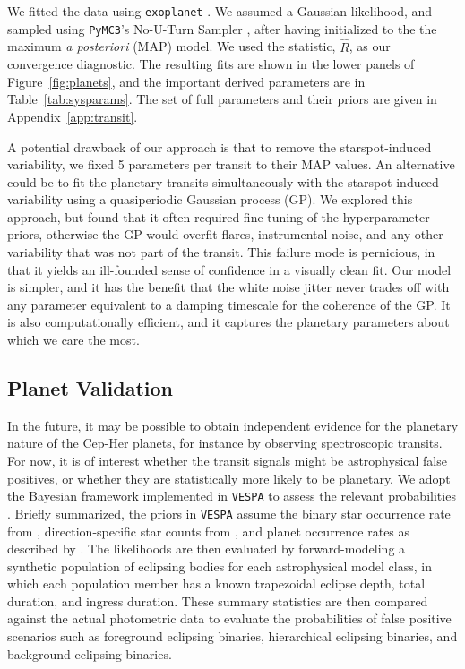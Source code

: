 \documentclass[12pt,twocolumn]{aastex63}
\begin{document}
We fitted the data using \texttt{exoplanet}
\citep{exoplanet:exoplanet}.  We assumed a Gaussian likelihood, and
sampled using \texttt{PyMC3}'s No-U-Turn Sampler
\citep{hoffman_no-u-turn_2014}, after having initialized to the the
maximum {\it a posteriori} (MAP) model.  We used the
\citet{gelman_inference_1992} statistic, $\hat{R}$, as our convergence
diagnostic.  The resulting fits are shown in the lower panels of
Figure~\ref{fig:planets}, and the important derived parameters are in
Table~\ref{tab:sysparams}.  The set of full parameters and their
priors are given in Appendix~\ref{app:transit}.

A potential drawback of our approach is that to remove
the starspot-induced variability, we fixed 5 
parameters per transit to their MAP values.
An alternative could be to fit the
planetary transits simultaneously with the starspot-induced
variability using a quasiperiodic Gaussian process (GP).  We explored
this approach, but found that it often required fine-tuning of the
hyperparameter priors, otherwise the GP would overfit flares,
instrumental noise, and any other variability that was not part of the
transit.  This failure mode is pernicious, in that it yields an
ill-founded sense of confidence in a visually clean fit.  Our model is
simpler, and it has the benefit that the white noise jitter never
trades off with any parameter equivalent to a damping timescale for
the coherence of the GP.  It is also computationally efficient, and it
captures the planetary parameters about which we care the most.


\subsection{Planet Validation}

In the future, it may be possible to obtain independent evidence for
the planetary nature of the Cep-Her planets, for instance by observing
spectroscopic transits.  For now,
it is of interest whether the transit signals might be astrophysical
false positives, or whether they are statistically more likely to be
planetary.  We adopt the Bayesian framework implemented in
\texttt{VESPA} to assess the relevant probabilities
\citep{morton_efficient_2012,vespa_2015}.  Briefly summarized, the
priors in \texttt{VESPA} assume the binary star occurrence rate from
\citet{raghavan_survey_2010}, direction-specific star counts from
\citet{girardi_star_2005}, and planet occurrence rates as described by
\citet[][Section~3.4]{morton_efficient_2012}.  The likelihoods are
then evaluated by forward-modeling a synthetic population of eclipsing
bodies for each astrophysical model class, in which each population
member has a known trapezoidal eclipse depth, total duration, and
ingress duration.  These summary statistics are then compared against
the actual photometric data to evaluate the probabilities of false
positive scenarios such as foreground eclipsing binaries, hierarchical
eclipsing binaries, and background eclipsing binaries.
\end{document}
